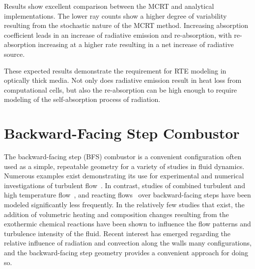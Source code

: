 



Results show excellent comparison between the MCRT and analytical implementations. 
The lower ray counts show a higher degree of variability resulting from the stochastic nature of the MCRT method. 
Increasing absorption coefficient leads in an increase of radiative emission and re-absorption, with re-absorption increasing at a higher rate resulting in a net increase of radiative source.

These expected results demonstrate the requirement for RTE modeling in optically thick media. Not only does radiative emission result in heat loss from computational cells, but also the re-absorption can be high enough to require modeling of the self-absorption process of radiation.

\section{Backward-Facing Step Combustor}
The backward-facing step (BFS) combustor is a convenient configuration often used as a simple, repeatable geometry for a variety of studies in fluid dynamics.
Numerous examples exist demonstrating its use for experimental and numerical investigations of turbulent flow~\cite{Armaly1983ExperimentalFlow,Neto1993AStep,Jovic1994Backward-facing5000,Le1997DirectStep}. In contrast, studies of combined turbulent and high temperature flow~\cite{Niemann2016Buoyancy-affectedNumber,Xie2017GeometrySteps}, and reacting flows~\cite{Pouech2021PremixedStep} over backward-facing steps have been modeled significantly less frequently.
In the relatively few studies that exist, the addition of volumetric heating and composition changes resulting from the exothermic chemical reactions have been shown to influence the flow patterns and turbulence intensity of the fluid. 
Recent interest has emerged regarding the relative influence of radiation and convection along the walls many configurations, and the backward-facing step geometry provides a convenient approach for doing so.

